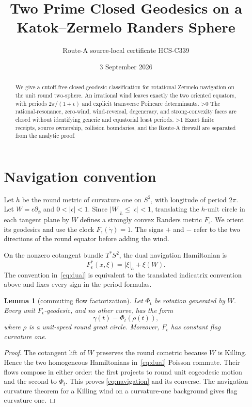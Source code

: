 \documentclass[10pt]{article}
\title{Two Prime Closed Geodesics on a Katok--Zermelo Randers Sphere}
\author{Route-A source-local certificate HCS-C339}
\date{3 September 2026}
\providecommand{\CRevisionRound}{2}
\newtheorem{lemma}[theorem]{Lemma}
\newcommand{\FF}{F_\epsilon}
\begin{document}
\maketitle
\begin{abstract}
We give a cutoff-free closed-geodesic classification for rotational Zermelo
navigation on the unit round two-sphere.  An irrational wind leaves exactly
the two oriented equators, with periods $2\pi/(1\pm\epsilon)$ and explicit
transverse Poincare determinants.
\ifnum\CRevisionRound>0
The rational-resonance, zero-wind, wind-reversal, degeneracy, and
strong-convexity faces are closed without identifying generic and equatorial
least periods.
\fi
\ifnum\CRevisionRound>1
Exact finite receipts, source ownership, collision boundaries, and the
Route-A firewall are separated from the analytic proof.
\fi
\end{abstract}

\section{Navigation convention}
Let $h$ be the round metric of curvature one on $S^2$, with longitude of
period $2\pi$.  Let $W=\epsilon\partial_\phi$ and
$0<|\epsilon|<1$.  Since $|W|_h\le |\epsilon|<1$, translating the
$h$-unit circle in each tangent plane by $W$ defines a strongly convex
Randers metric $\FF$.  We orient its geodesics and use the clock
$\FF(\dot\gamma)=1$.  The signs $+$ and $-$ refer to the two directions of
the round equator before adding the wind.

On the nonzero cotangent bundle $T^*S^2$, the dual navigation Hamiltonian is
\begin{equation}\label{eq:dual}
 \FF^*(x,\xi)=|\xi|_h+\xi(W).
\end{equation}
The convention in~\eqref{eq:dual} is equivalent to the translated
indicatrix convention above and fixes every sign in the period formulas.

\begin{lemma}[commuting flow factorization]\label{lem:factor}
Let $\Phi_t$ be rotation generated by $W$.  Every unit $\FF$-geodesic,
and no other curve, has the form
\begin{equation}\label{eq:navigation}
 \gamma(t)=\Phi_t(\rho(t)),
\end{equation}
where $\rho$ is a unit-speed round great circle.  Moreover, $\FF$ has
constant flag curvature one.
\end{lemma}

\begin{proof}
The cotangent lift of $W$ preserves the round cometric because $W$ is
Killing.  Hence the two homogeneous Hamiltonians in~\eqref{eq:dual} Poisson
commute.  Their flows compose in either order: the first projects to round
unit cogeodesic motion and the second to $\Phi_t$.  This proves
\eqref{eq:navigation} and its converse.  The navigation curvature theorem
for a Killing wind on a curvature-one background gives flag curvature one.
\end{proof}
\end{document}
